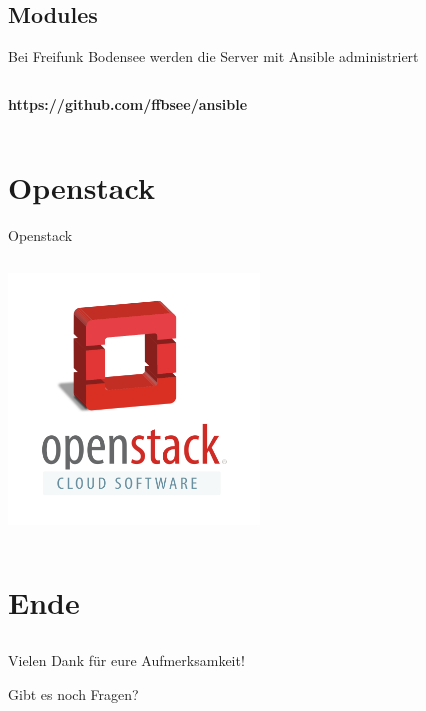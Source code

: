 \documentclass[aspectratio=169]{beamer}
\begin{document}
\subsection{Modules} 
\begin{frame}{Bei Freifunk Bodensee werden die Server mit Ansible administriert}
    \begin{columns}
        \begin{column}{1.0\textwidth}
            \centering
            \textbf{https://github.com/ffbsee/ansible} \\
            
        \end{column}
    \end{columns}
\end{frame}




\section{Openstack} 
\begin{frame}{Openstack}
    \begin{columns}
        \begin{column}{1.0\textwidth}
            \centering
            \includegraphics[width=0.5\textwidth]{openstack.png}
        \end{column}
    \end{columns}
\end{frame}



\section{Ende}
 \subsection{}
\begin{frame}{}
    \begin{center}
        {\Huge Vielen Dank für eure Aufmerksamkeit!}
        
        \vspace{0.8cm}
        
        {\huge Gibt es noch Fragen?}
    \end{center}
\end{frame}
\end{document}

